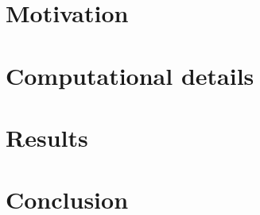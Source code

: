 

\title{\titletext}



    \maketitle

    \section{Motivation}
        \label{sec:motivation}
        

    \section{Computational details}
        \label{sec:computational}
        

    \section{Results}
        \label{sec:results}
        

    \section{Conclusion}
        \label{sec:conclusion}
        

    
    

